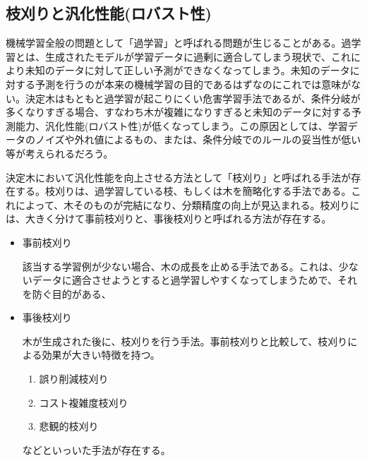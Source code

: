 \documentclass[dvipdfmx]{jsarticle}
\begin{document}
\subsection{枝刈りと汎化性能(ロバスト性)}
機械学習全般の問題として「過学習」と呼ばれる問題が生じることがある。過学習とは、生成されたモデルが学習データに過剰に適合してしまう現状で、これにより未知のデータに対して正しい予測ができなくなってしまう。未知のデータに対する予測を行うのが本来の機械学習の目的であるはずなのにこれでは意味がない。決定木はもともと過学習が起こりにくい危害学習手法であるが、条件分岐が多くなりすぎる場合、すなわち木が複雑になりすぎると未知のデータに対する予測能力、汎化性能(ロバスト性)が低くなってしまう。この原因としては、学習データのノイズや外れ値によるもの、または、条件分岐でのルールの妥当性が低い等が考えられるだろう。\par
決定木において汎化性能を向上させる方法として「枝刈り」と呼ばれる手法が存在する。枝刈りは、過学習している枝、もしくは木を簡略化する手法である。これによって、木そのものが完結になり、分類精度の向上が見込まれる。枝刈りには、大きく分けて事前枝刈りと、事後枝刈りと呼ばれる方法が存在する。
\begin{itemize}
  \item 事前枝刈り\par
  該当する学習例が少ない場合、木の成長を止める手法である。これは、少ないデータに適合させようとすると過学習しやすくなってしまうためで、それを防ぐ目的がある、
  \item 事後枝刈り\par
  木が生成された後に、枝刈りを行う手法。事前枝刈りと比較して、枝刈りによる効果が大きい特徴を持つ。
  \begin{enumerate}
    \item 誤り削減枝刈り
    \item コスト複雑度枝刈り
    \item 悲観的枝刈り
  \end{enumerate}
  などといっいた手法が存在する。
\end{itemize}
\end{document}

